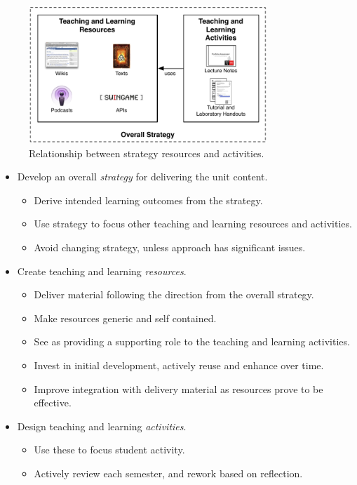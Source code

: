 \begin{figure}[htbp]
	\centering
	\includegraphics[width=0.8\textwidth]{StrategyResourcesActivities}
	\caption{Relationship between strategy resources and activities.}
	\label{fig:strategy}
\end{figure}

\begin{itemize}
	\item Develop an overall \emph{strategy} for delivering the unit content.
	\begin{itemize}
		\item Derive intended learning outcomes from the strategy.
		\item Use strategy to focus other teaching and learning resources and activities.
		\item Avoid changing strategy, unless approach has significant issues.
	\end{itemize}

	\item Create teaching and learning \emph{resources}.
	\begin{itemize}
		\item Deliver material following the direction from the overall strategy.
		\item Make resources generic and self contained.
		\item See as providing a supporting role to the teaching and learning activities.
		\item Invest in initial development, actively reuse and enhance over time.
		\item Improve integration with delivery material as resources prove to be effective.
	\end{itemize}

	\item Design teaching and learning \emph{activities}.
	\begin{itemize}
		\item Use these to focus student activity.
		\item Actively review each semester, and rework based on reflection.
	\end{itemize}
\end{itemize} 

